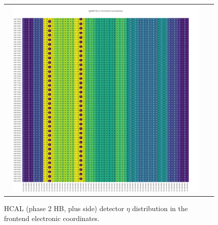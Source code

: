 \clearpage
\begin{figure}[htb]
 \begin{center}
  \begin{tabular}{cc}
   \includegraphics[angle=0,width=0.95\textwidth]{figures/appendix/ngHBP_Eta_in_FrontEnd.png}
  \end{tabular}
	\caption{HCAL (phase 2 HB, plus side) detector $\eta$ distribution in the frontend electronic coordinates.}
  \label{fig:lmapngHBPEtaFEC}
 \end{center}
\end{figure}


